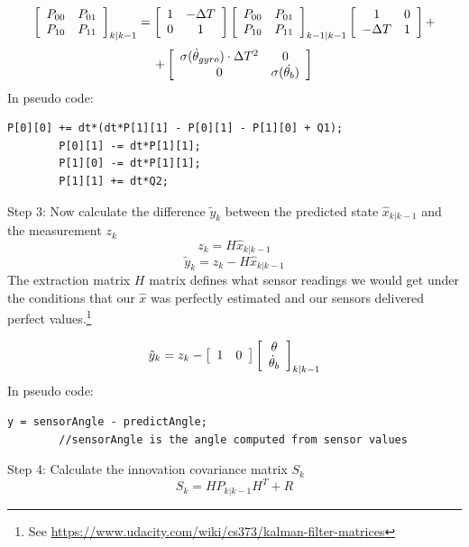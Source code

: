 \documentclass[a4paper]{report}
\begin{document}
		\begin{equation*}
		\left[
		\begin{array}{c c}
		P_{00}	&	P_{01}\\
		P_{10}	&	P_{11}
		\end{array} \right]_{k|k-1}
		=
		\left[
		\begin{array}{c c}
		1 & - \Delta T\\
		0 & 1
		\end{array} \right]
		\left[
		\begin{array}{c c}
		P_{00}	&	P_{01}\\
		P_{10}	&	P_{11}
		\end{array} \right]_{k-1|k-1}
		\left[
		\begin{array}{c c}
		1	&	0\\
		- \Delta T & 1
		\end{array} \right]
		+
		\end{equation*}
		\begin{equation}
		+
		\left[
		\begin{array}{c c}
		\sigma(\dot{\theta}_{gyro})\cdot\Delta T^{2}	&	0\\
		0	&	 \sigma(\dot{\theta_{b}})
		\end{array} \right]
		\end{equation}
    In pseudo code:
		\begin{lstlisting}[frame=single]
		P[0][0] += dt*(dt*P[1][1] - P[0][1] - P[1][0] + Q1);
		P[0][1] -= dt*P[1][1];
		P[1][0] -= dt*P[1][1];
		P[1][1] += dt*Q2;
		\end{lstlisting}
		Step 3: Now calculate the difference $\tilde{y}_{k}$ between the predicted state $\hat{x}_{k|k-1}$ and the measurement $z_{k}$
		\begin{equation}
		z_{k}=H\hat{x}_{k|k-1}
		\end{equation}
		\begin{equation}
		\tilde{y}_{k}=z_{k}-H\hat{x}_{k|k-1}
		\end{equation}
		The extraction matrix $H$ matrix defines what sensor readings we would get under the conditions that our $\hat{x}$ was perfectly estimated and our sensors delivered perfect values.\footnote{See  \url{https://www.udacity.com/wiki/cs373/kalman-filter-matrices}}
		
		\begin{equation}
		\tilde{y}_{k}=z_{k}-\left[
		\begin{array}{c c}
		1	&	0
		\end{array} \right]
		\left[
		\begin{array}{c}
		\theta \\
		\dot{\theta}_{b}
		\end{array} \right]_{k|k-1}
		\end{equation}
    In pseudo code:
		\begin{lstlisting}[frame=single]
		y = sensorAngle - predictAngle;
		//sensorAngle is the angle computed from sensor values
		\end{lstlisting}
		Step 4: Calculate the innovation covariance matrix $S_{k}$
		\begin{equation}
		S_{k}=HP_{k|k-1}H^{T}+R
		\end{equation}
\end{document}
